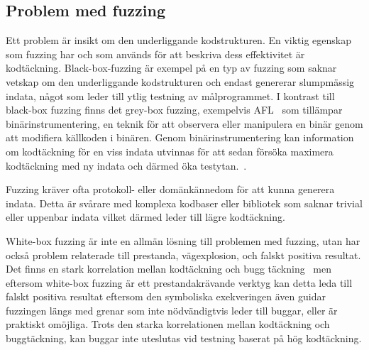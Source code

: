 \subsection{Problem med fuzzing} Ett problem är insikt om den underliggande
kodstrukturen. En viktig egenskap som fuzzing har och som används för att beskriva dess
effektivitet är kodtäckning. Black-box-fuzzing är exempel på en typ av fuzzing som
saknar vetskap om den underliggande kodstrukturen och endast genererar
slumpmässig indata, något som leder till ytlig testning av målprogrammet. I
kontrast till black-box fuzzing finns det grey-box fuzzing, exempelvis
AFL~\cite{aflplusplus} som tillämpar binärinstrumentering, en
teknik för att observera eller manipulera en binär genom att modifiera källkoden
i binären. Genom binärinstrumentering kan information om kodtäckning
för en viss indata utvinnas för att sedan försöka maximera kodtäckning med ny indata
och därmed öka testytan.~\cite{challenges_fuzzing}.


Fuzzing kräver ofta protokoll- eller domänkännedom för att kunna generera
indata. Detta är svårare med komplexa kodbaser eller bibliotek som saknar
trivial eller uppenbar indata vilket därmed leder till lägre kodtäckning.

White-box fuzzing är inte en allmän lösning till problemen med fuzzing, utan
har också problem relaterade till prestanda, vägexplosion, och falskt positiva
resultat. Det finns en stark korrelation mellan kodtäckning och bugg
täckning~\cite{directed_greybox_fuzzing} men eftersom white-box fuzzing är ett
prestandakrävande verktyg kan detta leda till falskt positiva resultat eftersom den
symboliska exekveringen även guidar fuzzingen längs med grenar som
inte nödvändigtvis leder till buggar, eller är praktiskt omöjliga.
Trots den starka korrelationen mellan kodtäckning och buggtäckning, kan buggar inte uteslutas vid
testning baserat på hög kodtäckning.


